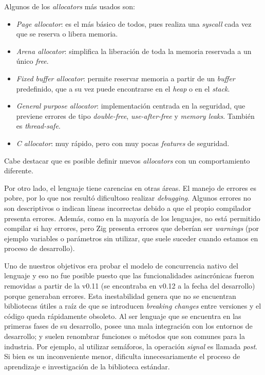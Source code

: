\documentclass[11pt]{article}
\newcommand{\english}[1]{\textit{#1}}
\begin{document}
Algunos de los \english{allocators} más usados son:

\begin{itemize}
    \item \english{Page allocator}: es el más básico de todos, pues realiza una \english{syscall} cada vez que se reserva o libera memoria.
    \item \english{Arena allocator}: simplifica la liberación de toda la memoria reservada a un único \english{free}.
    \item \english{Fixed buffer allocator}: permite reservar memoria a partir de un \english{buffer} predefinido, que a su vez puede encontrarse en el \english{heap} o en el \english{stack}.
    \item \english{General purpose allocator}: implementación centrada en la seguridad, que previene errores de tipo \english{double-free}, \english{use-after-free} y \english{memory leaks}. También es \english{thread-safe}.
    \item \english{C allocator}: muy rápido, pero con muy pocas \english{features} de seguridad.
\end{itemize}

Cabe destacar que es posible definir nuevos \english{allocators} con un comportamiento diferente.


Por otro lado, el lenguaje tiene carencias en otras áreas. El manejo de errores es pobre, por lo que nos resultó dificultoso realizar \english{debugging}. Algunos errores no son descriptivos o indican líneas incorrectas debido a que el propio compilador presenta errores. Además, como en la mayoría de los lenguajes, no está permitido compilar si hay errores, pero Zig presenta errores que deberían ser \english{warnings} (por ejemplo variables o parámetros sin utilizar, que suele suceder cuando estamos en proceso de desarrollo). 

Uno de nuestros objetivos era probar el modelo de concurrencia nativo del lenguaje y eso no fue posible puesto que las funcionalidades asincrónicas fueron removidas a partir de la v0.11 (se encontraba en v0.12 a la fecha del desarrollo) porque generaban errores. Esta inestabilidad genera que no se encuentran bibliotecas útiles a raíz de que se introducen \english{breaking changes} entre versiones y el código queda rápidamente obsoleto. Al ser lenguaje que se encuentra en las primeras fases de su desarrollo, posee una mala integración con los entornos de desarrollo; y suelen renombrar funciones o métodos que son comunes para la industria. Por ejemplo, al utilizar semáforos, la operación \english{signal} es llamada \english{post}. Si bien es un inconveniente menor, dificulta innecesariamente el proceso de aprendizaje e investigación de la biblioteca estándar.
\end{document}

